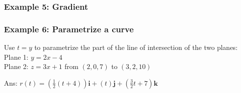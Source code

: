 \subsubsection{Example 5: Gradient}

\subsubsection{Example 6: Parametrize a curve}
Use $t=y$ to parametrize the part of the line of intersection of the two planes:\\
Plane 1: $y=2x-4$\\
Plane 2: $z=3x+1$ from $(2,0,7)$ to $(3,2,10)$

Ans: $r(t)=\left(\frac{1}{2}(t+4)\right)\mathbf{i}+(t)\mathbf{j}+\left(\frac{3}{2}t+7\right)\mathbf{k}$

